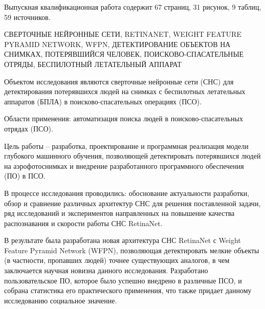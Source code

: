 \documentclass[a4paper,14pt]{extarticle} %
\begin{document}

Выпускная квалификационная работа содержит 67 страниц, 31 рисунок, 9 таблиц, 59 источников.

\MakeUppercase{сверточные нейронные сети, RetinaNet, Weight Feature Pyramid Network, WFPN, детектирование объектов на снимках, потерявшийся человек, поисково-спасательные отряды, беспилотный летательный аппарат}

Объектом исследования являются сверточные нейронные сети (СНС) для детектирования потерявшихся людей на снимках с беспилотных летательных аппаратов (БПЛА) в поисково-спасательных операциях (ПСО).

Области применения: автоматизация поиска людей в поисково-спасательных отрядах (ПСО).

Цель работы -- разработка, проектирование и программная реализация модели глубокого машинного обучения, позволяющей детектировать потерявшихся людей на аэрофотоснимках и внедрение разработанного программного обеспечения (ПО) в ПСО.

В процессе исследования проводились: обоснование актуальности разработки, обзор и сравнение различных архитектур СНС для решения поставленной задачи, ряд исследований и экспериментов направленных на повышение качества распознавания и скорости работы СНС RetinaNet.

В результате была разработана новая архитектура СНС RetinaNet с Weight Feature Pyramid Network (WFPN), позволяющая детектировать мелкие объекты (в частности, пропавших людей) точнее существующих аналогов, в чем заключается научная новизна данного исследования. Разработано пользовательское ПО, которое было успешно внедрено в различные ПСО, и собрана статистика его практического применения, что также придает данному исследованию социальное значение.
\end{document}
